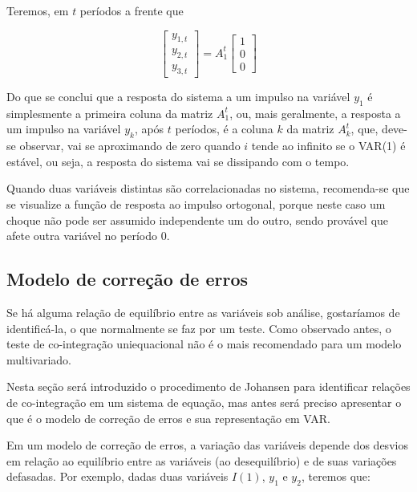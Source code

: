 \documentclass[a4paper,
               article,
               12pt,
               openany,
               oneside,
               english,
               brazil]{abntex2}
\numberwithin{equation}{section}
\begin{document}
    Teremos, em $ t $ períodos a frente que

    \begin{equation*}
        \label{impulse-response}
        \begin{bmatrix}
            y_{1,t} \\
            y_{2,t} \\
            y_{3,t}
        \end{bmatrix} =
        A_1^{t}
        \begin{bmatrix}
            1 \\
            0 \\
            0
        \end{bmatrix}
    \end{equation*}

    Do que se conclui que a resposta do sistema a um impulso na variável $ y_1 $ é simplesmente a primeira coluna da matriz $ A_1^{t} $, ou, mais geralmente, a resposta a um impulso na variável $ y_k $, após $ t $ períodos, é a coluna $ k $ da matriz $ A_k^{t} $, que, deve-se observar, vai se aproximando de zero quando $ i $ tende ao infinito se o VAR(1) é estável, ou seja, a resposta do sistema vai se dissipando com o tempo.

   Quando duas variáveis distintas são correlacionadas no sistema, recomenda-se que se visualize a função de resposta ao impulso ortogonal, porque neste caso um choque não pode ser assumido independente um do outro, sendo provável que afete outra variável no período $ 0 $.

    \subsection{Modelo de correção de erros}

    Se há alguma relação de equilíbrio entre as variáveis sob análise, gostaríamos de identificá-la, o que normalmente se faz por um teste. Como observado antes, o teste de co-integração uniequacional não é o mais recomendado para um modelo multivariado.
    
    Nesta seção será introduzido o procedimento de Johansen para identificar relações de co-integração em um sistema de equação, mas antes será preciso apresentar o que é o modelo de correção de erros e sua representação em VAR.

    Em um modelo de correção de erros, a variação das variáveis depende dos desvios em relação ao equilíbrio entre as variáveis (ao desequilíbrio) e de suas variações defasadas. Por exemplo, dadas duas variáveis $ I(1) $, $ y_1 $ e $ y_2 $, teremos que:
\end{document}
